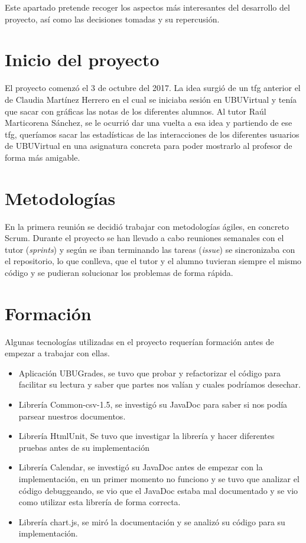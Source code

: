 
Este apartado pretende recoger los aspectos más interesantes del desarrollo del proyecto, así como las decisiones tomadas y su repercusión.

\section{Inicio del proyecto}\label{inicio-del-proyecto}

El proyecto comenzó el 3 de octubre del 2017. La idea surgió de un tfg anterior el de Claudia Martínez Herrero \cite{claudia} en el cual se iniciaba sesión en UBUVirtual y tenía que sacar con gráficas las notas de los diferentes alumnos. Al tutor Raúl Marticorena Sánchez, se le ocurrió dar una vuelta a esa idea y partiendo de ese tfg, queríamos sacar las estadísticas de las interacciones de los diferentes usuarios de UBUVirtual en una asignatura concreta para poder mostrarlo al profesor de forma más amigable.


\section{Metodologías}\label{metodologias-proyecto}

En la primera reunión se decidió trabajar con metodologías ágiles, en concreto Scrum. Durante el proyecto se han llevado a cabo reuniones semanales con el tutor (\emph{sprints}) y según se iban terminando las tareas (\emph{issue}) se sincronizaba con el repositorio, lo que conlleva, que el tutor y el alumno tuvieran siempre el mismo código y se pudieran solucionar los problemas de forma rápida.

\section{Formación}\label{formacion}

Algunas tecnologías utilizadas en el proyecto requerían formación antes de empezar a trabajar con ellas.

\begin{itemize}
	\tightlist
	\item
	Aplicación UBUGrades, se tuvo que probar y refactorizar el código para facilitar su lectura y saber que partes nos valían y cuales podríamos desechar.
	\item
	Librería Common-csv-1.5, se investigó su JavaDoc para saber si nos podía parsear nuestros documentos.
	\item
	Librería HtmlUnit, Se tuvo que investigar la librería y hacer diferentes pruebas antes de su implementación
	\item
	Librería Calendar, se investigó su JavaDoc antes de empezar con la implementación, en un primer momento no funciono y se tuvo que analizar el código debuggeando, se vio que el JavaDoc estaba mal documentado y se vio como utilizar esta librería de forma correcta.
	\item
	Librería chart.js, se miró la documentación \cite{javascript:chart} y se analizó su código para su implementación.
\end{itemize}

